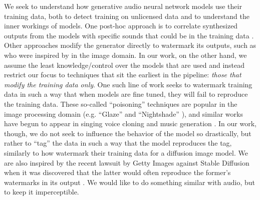 \documentclass[letterpaper]{article} %
\begin{document}
We seek to understand how generative audio neural network models use their training data, both to detect training on unlicensed data and to understand the inner workings of models.  One post-hoc approach is to correlate synthesized outputs from the models with specific sounds that could be in the training data \cite{batlle2024towards, barnett2024exploring}.  Other approaches modify the generator directly to watermark its outputs, such as \cite{cao2023invisible} who were inspired by \cite{wen2023tree} in the image domain.  In our work, on the other hand, we assume the least knowledge/control over the models that are used and instead restrict our focus to techniques that sit the earliest in the pipeline: {\em those that modify the training data only}. One such line of work seeks to watermark training data in such a way that when models are fine tuned, they will fail to reproduce the training data.  These so-called ``poisoning'' techniques are popular in the image processing domain (e.g. ``Glaze'' \cite{shan2023glaze} and ``Nightshade'' \cite{shan2023prompt}), and similar works have begun to appear in singing voice cloning \cite{chen2024proactive} and music generation \cite{barnett2024defenses, meerza2025harmonycloak}.  In our work, though, we do not seek to influence the behavior of the model so drastically, but rather to ``tag'' the data in such a way that the model reproduces the tag, similarly to how \cite{ditria2023hey} watermark their training data for a diffusion image model.  We are also inspired by the recent lawsuit by Getty Images against Stable Diffusion when it was discovered that the latter would often reproduce the former's watermarks in its output \cite{vincent2023getty}.  We would like to do something similar with audio, but to keep it imperceptible.
\end{document}
